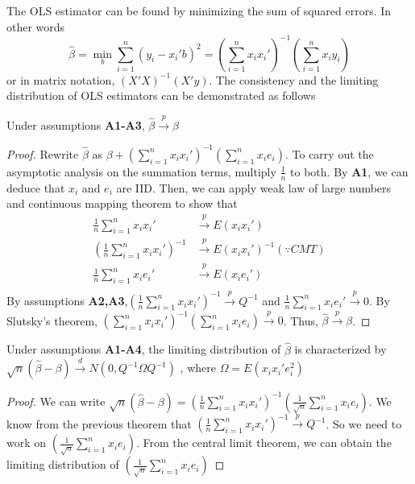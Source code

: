 The OLS estimator can be found by minimizing the sum of squared errors. In other words
\[
\hat{\beta}=\min_b\sum_{i=1}^n (y_i-x_i'b)^2 = \left(\sum_{i=1}^nx_ix_i'\right)^{-1}\left(\sum_{i=1}^nx_iy_i\right)
\]
or in matrix notation, $(X'X)^{-1}(X'y)$. The consistency and the limiting distribution of OLS estimators can be demonstrated as follows
\begin{mdframed}[backgroundcolor=green!5] 
\begin{theorem}
Under assumptions \textbf{A1-A3}, $\hat{\beta}\xrightarrow{p}\beta$
\begin{proof}
Rewrite $\hat{\beta}$ as $\beta+\left(\sum_{i=1}^nx_ix_i'\right)^{-1}\left(\sum_{i=1}^nx_ie_i\right)$. To carry out the asymptotic analysis on the summation terms, multiply $\frac{1}{n}$ to both. By \textbf{A1}, we can deduce that $x_i$ and $e_i$ are IID. Then, we can apply weak law of large numbers and continuous mapping theorem to show that
\[
\begin{aligned}
\frac{1}{n}\sum_{i=1}^nx_ix_i'&\xrightarrow{p}E\left(x_ix_i'\right) \\
\left(\frac{1}{n}\sum_{i=1}^nx_ix_i'\right)^{-1}&\xrightarrow{p}E\left(x_ix_i'\right)^{-1} (\because CMT)\\
\frac{1}{n}\sum_{i=1}^nx_ie_i'&\xrightarrow{p}E\left(x_ie_i'\right) \\
\end{aligned}
\]
By assumptions \textbf{A2,A3},$\left(\frac{1}{n}\sum_{i=1}^nx_ix_i'\right)^{-1}\xrightarrow{p}Q^{-1}$ and $\frac{1}{n}\sum_{i=1}^nx_ie_i'\xrightarrow{p}0$. By Slutsky's theorem, $\left(\sum_{i=1}^nx_ix_i'\right)^{-1}\left(\sum_{i=1}^nx_ie_i\right)\xrightarrow{p}0$. Thus, $\hat{\beta}\xrightarrow{p}\beta$.
\end{proof}
\end{theorem}
\begin{theorem}
Under assumptions \textbf{A1-A4}, the limiting distribution of $\hat{\beta}$ is characterized by $\sqrt{n}(\hat{\beta}-\beta)\xrightarrow{d}N(0,Q^{-1}\Omega Q^{-1})$ , where $\Omega = E(x_ix_i'e_i^2)$
\begin{proof}
We can write $\sqrt{n}(\hat{\beta}-\beta)=\left(\frac{1}{n}\sum_{i=1}^nx_ix_i'\right)^{-1}\left(\frac{1}{\sqrt{n}}\sum_{i=1}^nx_ie_i\right)$. We know from the previous theorem that $\left(\frac{1}{n}\sum_{i=1}^nx_ix_i'\right)^{-1}\xrightarrow{p}Q^{-1}$. So we need to work on $\left(\frac{1}{\sqrt{n}}\sum_{i=1}^nx_ie_i\right)$. From the central limit theorem, we can obtain the limiting distribution of  $\left(\frac{1}{\sqrt{n}}\sum_{i=1}^nx_ie_i\right)$ 

\end{proof}
\end{theorem}
\end{mdframed}
